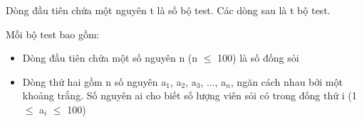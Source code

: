 Dòng đầu tiên chứa một nguyên t là số bộ test. Các dòng sau là t bộ test.

Mỗi bộ test bao gồm:
\begin{itemize}
	\item Dòng đầu tiên chứa một số nguyên n (n  $\le$  100) là số đống sỏi
	\item Dòng thứ hai gồm n số nguyên a$_1$, a$_2$, a$_3$, ..., a$_n$, ngăn cách nhau bởi một khoảng trắng. Số nguyên ai cho biết số lượng viên sỏi có trong đống thứ i (1  $\le$  a$_i $  $\le$  100)
\end{itemize}